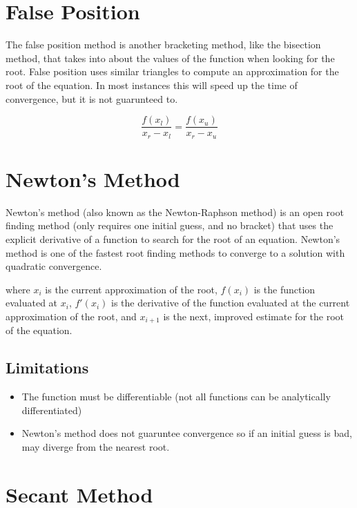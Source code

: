 \documentclass{../../KDHnotes}
\begin{document}
\section{False Position}

The false position method is another bracketing method, like the bisection method, that takes into about the values of the function when looking for the root. False position uses similar triangles to compute an approximation for the root of the equation. In most instances this will speed up the time of convergence, but it is not guarunteed to.

\begin{equation}
  \frac{f(x_l)}{x_r-x_l} = \frac{f(x_u)}{x_r-x_u}
\end{equation}


\section{Newton's Method}

Newton's method (also known as the Newton-Raphson method) is an open root finding method (only requires one initial guess, and no bracket) that uses the explicit derivative of a function to search for the root of an equation. Newton's method is one of the fastest root finding methods to converge to a solution with quadratic convergence.


where $x_i$ is the current approximation of the root, $f(x_i)$ is the function evaluated at $x_i$, $f'(x_i)$ is the derivative of the function evaluated at the current approximation of the root, and $x_{i+1}$ is the next, improved estimate for the root of the equation.

\subsection{Limitations}
\begin{itemize}
\item The function must be differentiable (not all functions can be analytically differentiated)
\item Newton's method does not guaruntee convergence so if an initial guess is bad, may diverge from the nearest root.
\end{itemize}

\section{Secant Method}
\end{document}
